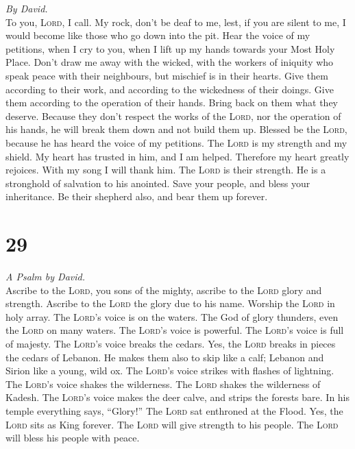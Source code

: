 \emph{By David.}\\
 To you, \textsc{Lord}, I call. My rock, don't be deaf to
me, lest, if you are silent to me, I would become like those who go down
into the pit.  Hear the voice of my petitions, when I cry
to you, when I lift up my hands towards your Most Holy Place.
 Don't draw me away with the wicked, with the workers of
iniquity who speak peace with their neighbours, but mischief is in their
hearts.  Give them according to their work, and according
to the wickedness of their doings. Give them according to the operation
of their hands. Bring back on them what they deserve. 
Because they don't respect the works of the \textsc{Lord}, nor the
operation of his hands, he will break them down and not build them up.
 Blessed be the \textsc{Lord}, because he has heard the
voice of my petitions.  The \textsc{Lord} is my strength
and my shield. My heart has trusted in him, and I am helped. Therefore
my heart greatly rejoices. With my song I will thank him. 
The \textsc{Lord} is their strength. He is a stronghold of salvation to
his anointed.  Save your people, and bless your
inheritance. Be their shepherd also, and bear them up forever.

\hypertarget{section-28}{%
\section{29}\label{section-28}}

\emph{A Psalm by David.}\\
 Ascribe to the \textsc{Lord}, you sons of the mighty,
ascribe to the \textsc{Lord} glory and strength.  Ascribe
to the \textsc{Lord} the glory due to his name. Worship the
\textsc{Lord} in holy array.  The \textsc{Lord}'s voice is
on the waters. The God of glory thunders, even the \textsc{Lord} on many
waters.  The \textsc{Lord}'s voice is powerful. The
\textsc{Lord}'s voice is full of majesty.  The
\textsc{Lord}'s voice breaks the cedars. Yes, the \textsc{Lord} breaks
in pieces the cedars of Lebanon.  He makes them also to
skip like a calf; Lebanon and Sirion like a young, wild ox.
 The \textsc{Lord}'s voice strikes with flashes of
lightning.  The \textsc{Lord}'s voice shakes the
wilderness. The \textsc{Lord} shakes the wilderness of Kadesh.
 The \textsc{Lord}'s voice makes the deer calve, and
strips the forests bare. In his temple everything says, ``Glory!''
 The \textsc{Lord} sat enthroned at the Flood. Yes, the
\textsc{Lord} sits as King forever.  The \textsc{Lord}
will give strength to his people. The \textsc{Lord} will bless his
people with peace.

